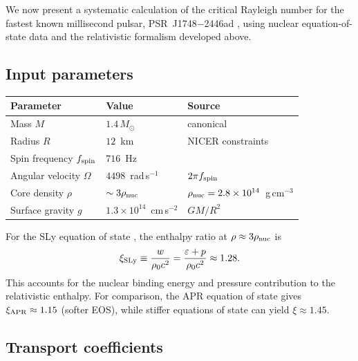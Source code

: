 We now present a systematic calculation of the critical Rayleigh number
for the fastest known millisecond pulsar, PSR~J1748$-$2446ad
\citep{HesselsEtAl2006}, using nuclear equation-of-state data
and the relativistic formalism developed above.

\subsection{Input parameters}

\begin{center}
\begin{tabular}{lll}
\hline
Parameter & Value & Source \\
\hline
Mass $M$ & $1.4\,M_\odot$ & canonical \\
Radius $R$ & $12$~km & NICER constraints \citep{RileyEtAl2021} \\
Spin frequency $f_{\rm spin}$ & $716$~Hz & \citet{HesselsEtAl2006} \\
Angular velocity $\Omega$ & $4498$~rad\,s$^{-1}$ & $2\pi f_{\rm spin}$ \\
Core density $\rho$ & $\sim 3\rho_{\rm nuc}$ & $\rho_{\rm nuc} = 2.8\times 10^{14}$~g\,cm$^{-3}$ \\
Surface gravity $g$ & $1.3\times 10^{14}$~cm\,s$^{-2}$ & $GM/R^2$ \\
\hline
\end{tabular}
\end{center}

For the SLy equation of state \citep{DouchinHaensel2001}, the
enthalpy ratio at $\rho \approx 3\rho_{\rm nuc}$ is
\begin{equation}\label{eq:xi-SLy}
  \xi_{\rm SLy}
  \equiv \frac{w}{\rho_0 c^2}
  = \frac{\varepsilon + p}{\rho_0 c^2}
  \approx 1.28.
\end{equation}
This accounts for the nuclear binding energy and pressure contribution
to the relativistic enthalpy.  For comparison, the APR equation of state
\citep{AkmalPR1998} gives $\xi_{\rm APR} \approx 1.15$ (softer EOS),
while stiffer equations of state can yield $\xi \approx 1.45$.

\subsection{Transport coefficients}


